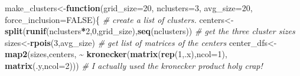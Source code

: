 \documentclass[
]{article}
\newenvironment{Shaded}{\begin{snugshade}}{\end{snugshade}}
\newcommand{\AttributeTok}[1]{\textcolor[rgb]{0.13,0.29,0.53}{#1}}
\newcommand{\CommentTok}[1]{\textcolor[rgb]{0.56,0.35,0.01}{\textit{#1}}}
\newcommand{\ConstantTok}[1]{\textcolor[rgb]{0.56,0.35,0.01}{#1}}
\newcommand{\ControlFlowTok}[1]{\textcolor[rgb]{0.13,0.29,0.53}{\textbf{#1}}}
\newcommand{\DecValTok}[1]{\textcolor[rgb]{0.00,0.00,0.81}{#1}}
\newcommand{\FunctionTok}[1]{\textcolor[rgb]{0.13,0.29,0.53}{\textbf{#1}}}
\newcommand{\NormalTok}[1]{#1}
\newcommand{\OtherTok}[1]{\textcolor[rgb]{0.56,0.35,0.01}{#1}}
\newcommand{\SpecialCharTok}[1]{\textcolor[rgb]{0.81,0.36,0.00}{\textbf{#1}}}
\begin{document}
\begin{Shaded}
\begin{Highlighting}[]
\NormalTok{make\_clusters}\OtherTok{\textless{}{-}}\ControlFlowTok{function}\NormalTok{(}\AttributeTok{grid\_size=}\DecValTok{20}\NormalTok{, }\AttributeTok{nclusters=}\DecValTok{3}\NormalTok{, }\AttributeTok{avg\_size=}\DecValTok{20}\NormalTok{, }\AttributeTok{force\_inclusion=}\ConstantTok{FALSE}\NormalTok{)\{}
  \CommentTok{\# create a list of clusters.}
\NormalTok{  centers}\OtherTok{\textless{}{-}}\FunctionTok{split}\NormalTok{(}\FunctionTok{runif}\NormalTok{(nclusters}\SpecialCharTok{*}\DecValTok{2}\NormalTok{,}\DecValTok{0}\NormalTok{,grid\_size),}\FunctionTok{seq}\NormalTok{(nclusters))}
  \CommentTok{\# get the three cluster sizes}
\NormalTok{  sizes}\OtherTok{\textless{}{-}}\FunctionTok{rpois}\NormalTok{(}\DecValTok{3}\NormalTok{,avg\_size)}
  \CommentTok{\# get list of matrices of the centers}
\NormalTok{  center\_dfs}\OtherTok{\textless{}{-}}\FunctionTok{map2}\NormalTok{(sizes,centers,}
                   \SpecialCharTok{\textasciitilde{}} \FunctionTok{kronecker}\NormalTok{(}\FunctionTok{matrix}\NormalTok{(}\FunctionTok{rep}\NormalTok{(}\DecValTok{1}\NormalTok{,.x),}\AttributeTok{ncol=}\DecValTok{1}\NormalTok{), }\FunctionTok{matrix}\NormalTok{(.y,}\AttributeTok{ncol=}\DecValTok{2}\NormalTok{)))}
                              \CommentTok{\# I actually used the kronecker product holy crap!}
  

\end{Highlighting}
\end{Shaded}
\end{document}
